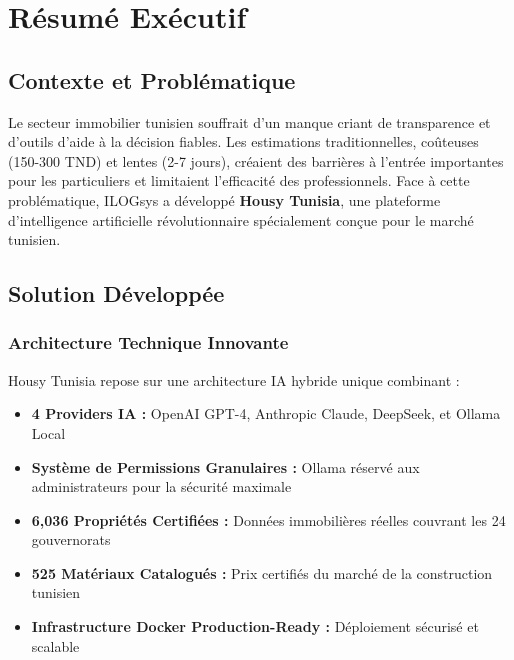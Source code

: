 
\chapter*{Résumé Exécutif}

\section*{Contexte et Problématique}

Le secteur immobilier tunisien souffrait d'un manque criant de transparence et d'outils d'aide à la décision fiables. Les estimations traditionnelles, coûteuses (150-300 TND) et lentes (2-7 jours), créaient des barrières à l'entrée importantes pour les particuliers et limitaient l'efficacité des professionnels. Face à cette problématique, ILOGsys a développé \textbf{Housy Tunisia}, une plateforme d'intelligence artificielle révolutionnaire spécialement conçue pour le marché tunisien.

\section*{Solution Développée}

\subsection*{Architecture Technique Innovante}

Housy Tunisia repose sur une architecture IA hybride unique combinant :

\begin{itemize}
    \item \textbf{4 Providers IA :} OpenAI GPT-4, Anthropic Claude, DeepSeek, et Ollama Local
    \item \textbf{Système de Permissions Granulaires :} Ollama réservé aux administrateurs pour la sécurité maximale
    \item \textbf{6,036 Propriétés Certifiées :} Données immobilières réelles couvrant les 24 gouvernorats
    \item \textbf{525 Matériaux Catalogués :} Prix certifiés du marché de la construction tunisien
    \item \textbf{Infrastructure Docker Production-Ready :} Déploiement sécurisé et scalable
\end{itemize}

